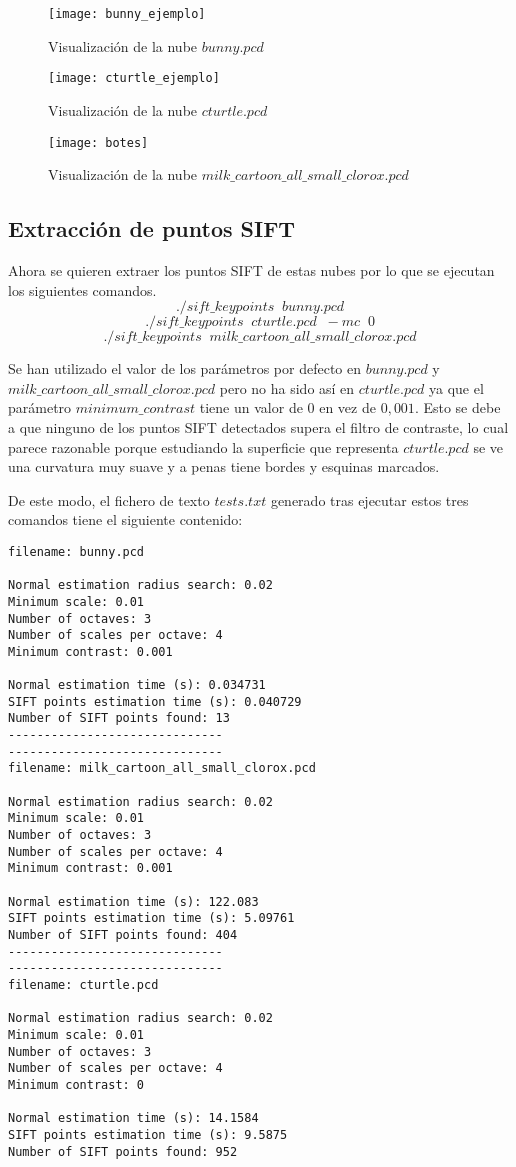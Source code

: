 \begin{figure}[!htb]
  \texttt{[image: bunny\_ejemplo]}
  \caption{Visualización de la nube $bunny.pcd$}\label{fig:bunny_ejemplo}
\endminipage\hfill
{}
  \texttt{[image: cturtle\_ejemplo]}
  \caption{Visualización de la nube $cturtle.pcd$}\label{fig:cturtle_ejemplo}
\endminipage\hfill
{}
  \texttt{[image: botes]}
  \caption{Visualización de la nube $milk\_cartoon\_all\_small\_clorox.pcd$}\label{fig:botes}
\endminipage\hfill
\end{figure}

\subsection{Extracción de puntos SIFT}
Ahora se quieren extraer los puntos SIFT de estas nubes por lo que se ejecutan los siguientes comandos.
$$./sift\_keypoints\;\;bunny.pcd$$
$$./sift\_keypoints\;\;cturtle.pcd\;\;-mc\;\;0$$
$$./sift\_keypoints\;\;milk\_cartoon\_all\_small\_clorox.pcd$$

Se han utilizado el valor de los parámetros por defecto en $bunny.pcd$ y \\
$milk\_cartoon\_all\_small\_clorox.pcd$ pero no ha sido así en $cturtle.pcd$ ya que el parámetro $minimum\_contrast$ tiene un valor de $0$ en vez de $0,001$. Esto se debe a que ninguno de los puntos SIFT detectados supera el filtro de contraste, lo cual parece razonable porque estudiando la superficie que representa $cturtle.pcd$ se ve una curvatura muy suave y a penas tiene bordes y esquinas marcados.

De este modo, el fichero de texto $tests.txt$ generado tras ejecutar estos tres comandos tiene el siguiente contenido:

\begin{lstlisting}
filename: bunny.pcd

Normal estimation radius search: 0.02
Minimum scale: 0.01
Number of octaves: 3
Number of scales per octave: 4
Minimum contrast: 0.001

Normal estimation time (s): 0.034731
SIFT points estimation time (s): 0.040729
Number of SIFT points found: 13
------------------------------
------------------------------
filename: milk_cartoon_all_small_clorox.pcd

Normal estimation radius search: 0.02
Minimum scale: 0.01
Number of octaves: 3
Number of scales per octave: 4
Minimum contrast: 0.001

Normal estimation time (s): 122.083
SIFT points estimation time (s): 5.09761
Number of SIFT points found: 404
------------------------------
------------------------------
filename: cturtle.pcd

Normal estimation radius search: 0.02
Minimum scale: 0.01
Number of octaves: 3
Number of scales per octave: 4
Minimum contrast: 0

Normal estimation time (s): 14.1584
SIFT points estimation time (s): 9.5875
Number of SIFT points found: 952
\end{lstlisting}


